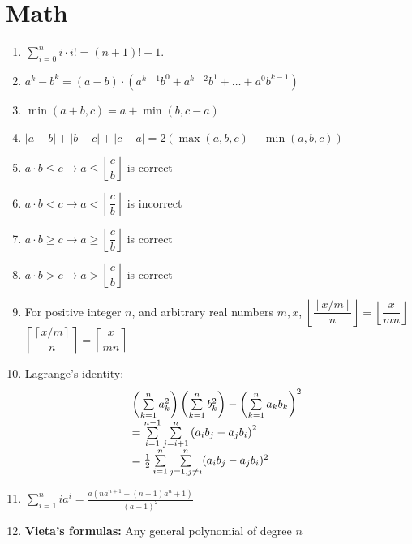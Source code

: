 \section{Math}
\begin{enumerate}[resume]
    \item $\displaystyle \sum_{i = 0}^n{i\cdot i!=(n + 1)! - 1}$.
    \item $\displaystyle a^k - b^k = (a - b) \cdot (a^{k - 1}b^0 + a^{k - 2}b^1 + \dots + a^0b^{k - 1})$
    \item $\displaystyle \min(a + b, c) = a + \min(b, c - a)$
    \item $|a - b| + |b - c| + |c - a| = 2 (\max (a, b, c) - \min (a, b, c))$
    \item $\displaystyle a \cdot b \leq c \rightarrow a \leq \left \lfloor \dfrac{c}{b} \right \rfloor$ is correct
    \item $\displaystyle a \cdot b < c \rightarrow a <  \left \lfloor \dfrac{c}{b} \right \rfloor$ is incorrect
    \item $\displaystyle a \cdot b \geq c \rightarrow a \geq  \left \lfloor \dfrac{c}{b} \right \rfloor$ is correct
    \item $\displaystyle a \cdot b > c \rightarrow a >  \left \lfloor \dfrac{c}{b} \right \rfloor$ is correct
    \item For positive integer $n$, and arbitrary real numbers $m,x$,
          $\displaystyle \left \lfloor \dfrac{\left \lfloor x/m \right \rfloor}{n} \right \rfloor = \left \lfloor \dfrac{x}{mn} \right \rfloor$
          $\displaystyle \left \lceil \dfrac{\left \lceil x/m \right \rceil}{n} \right \rceil = \left \lceil \dfrac{x}{mn} \right \rceil$
    \item Lagrange’s identity:
          \[\displaystyle \displaystyle {\displaystyle {\begin{array}{@{}l}\left(\sum \limits_{k=1}^{n}a_{k}^{2}\right)\left(\sum \limits_{k=1}^{n}b_{k}^{2}\right)-\left(\sum\limits_{k=1}^{n}a_{k}b_{k}\right)^{2} \\ =\sum \limits_{i=1}^{n-1}\sum \limits_{j=i+1}^{n}\left(a_{i}b_{j}-a_{j}b_{i}\right)^{2} \\ ={\frac {1}{2}}\sum \limits_{i=1}^{n}\sum \limits_{j=1,j\neq i}^{n}(a_{i}b_{j}-a_{j}b_{i})^{2}\end{array}}}\]
    \item $\displaystyle \sum_{i = 1}^n{ia^i} = \frac{a(n a^{n + 1} - (n + 1) a^n + 1)}{(a - 1)^2}$
    \item \textbf{Vieta’s formulas:}
          Any general polynomial of degree $n$

\end{enumerate}
